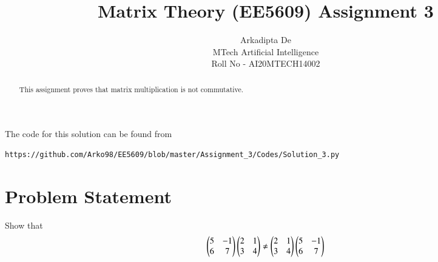 \documentclass[journal,12pt,twocolumn]{IEEEtran}
\begin{document}
     \def\rightbox#1{\makebox[0in][r]{#1}}
     \def\centbox#1{\makebox[0in]{#1}}
     \def\topbox#1{\raisebox{-\baselineskip}[0in][0in]{#1}}
     \def\midbox#1{\raisebox{-0.5\baselineskip}[0in][0in]{#1}}
\vspace{3cm}
\title{Matrix Theory (EE5609) Assignment 3}
\author{Arkadipta De \\MTech Artificial Intelligence\\Roll No - AI20MTECH14002}
\maketitle
\newpage
\bigskip
\renewcommand{\thetable}{\theenumi}
\begin{abstract}
This assignment proves that matrix multiplication is not commutative.
\end{abstract}
The code for this solution can be found from 
\begin{lstlisting}
https://github.com/Arko98/EE5609/blob/master/Assignment_3/Codes/Solution_3.py
\end{lstlisting}
\section{\textbf{Problem Statement}}Show that\\
\begin{align*}
\begin{pmatrix}5 & -1\\6 & 7\end{pmatrix}\begin{pmatrix}2 & 1\\3 & 4\end{pmatrix} \not= \begin{pmatrix}2 & 1\\3 & 4\end{pmatrix}\begin{pmatrix}5 & -1\\6 & 7\end{pmatrix}
\end{align*}
\end{document}
